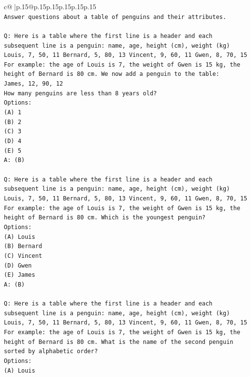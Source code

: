 \documentclass{article}
\begin{document}
{\begin{supertabular}{c@{$\;$}|p{.15\linewidth}@{}p{.15\linewidth}p{.15\linewidth}p{.15\linewidth}p{.15\linewidth}p{.15\linewidth}}
{{{\\ 
\texttt{Answer questions about a table of penguins and their attributes.} \\
\\ 
\texttt{Q: Here is a table where the first line is a header and each subsequent line is a penguin:  name, age, height (cm), weight (kg) Louis, 7, 50, 11 Bernard, 5, 80, 13 Vincent, 9, 60, 11 Gwen, 8, 70, 15  For example: the age of Louis is 7, the weight of Gwen is 15 kg, the height of Bernard is 80 cm.  We now add a penguin to the table:} \\
\texttt{James, 12, 90, 12} \\
\texttt{How many penguins are less than 8 years old?} \\
\texttt{Options:} \\
\texttt{(A) 1} \\
\texttt{(B) 2} \\
\texttt{(C) 3} \\
\texttt{(D) 4} \\
\texttt{(E) 5} \\
\texttt{A: (B)} \\
\\ 
\texttt{Q: Here is a table where the first line is a header and each subsequent line is a penguin:  name, age, height (cm), weight (kg) Louis, 7, 50, 11 Bernard, 5, 80, 13 Vincent, 9, 60, 11 Gwen, 8, 70, 15  For example: the age of Louis is 7, the weight of Gwen is 15 kg, the height of Bernard is 80 cm.  Which is the youngest penguin?} \\
\texttt{Options:} \\
\texttt{(A) Louis} \\
\texttt{(B) Bernard} \\
\texttt{(C) Vincent} \\
\texttt{(D) Gwen} \\
\texttt{(E) James} \\
\texttt{A: (B)} \\
\\ 
\texttt{Q: Here is a table where the first line is a header and each subsequent line is a penguin:  name, age, height (cm), weight (kg) Louis, 7, 50, 11 Bernard, 5, 80, 13 Vincent, 9, 60, 11 Gwen, 8, 70, 15  For example: the age of Louis is 7, the weight of Gwen is 15 kg, the height of Bernard is 80 cm.  What is the name of the second penguin sorted by alphabetic order?} \\
\texttt{Options:} \\
\texttt{(A) Louis} \\
}}}
\end{supertabular}}
\end{document}
